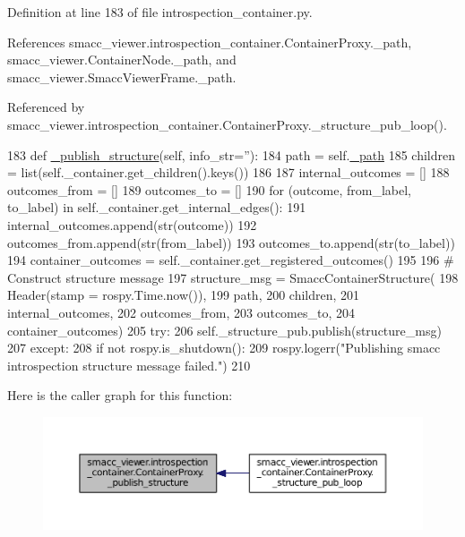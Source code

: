Definition at line 183 of file introspection\+\_\+container.\+py.



References smacc\+\_\+viewer.\+introspection\+\_\+container.\+Container\+Proxy.\+\_\+path, smacc\+\_\+viewer.\+Container\+Node.\+\_\+path, and smacc\+\_\+viewer.\+Smacc\+Viewer\+Frame.\+\_\+path.



Referenced by smacc\+\_\+viewer.\+introspection\+\_\+container.\+Container\+Proxy.\+\_\+structure\+\_\+pub\+\_\+loop().


\begin{DoxyCode}
183     \textcolor{keyword}{def }\hyperlink{classsmacc__viewer_1_1introspection__container_1_1ContainerProxy_a8d2ce0de04a41de61fea7a831b5d978d}{\_publish\_structure}(self, info\_str=''):
184         path = self.\hyperlink{classsmacc__viewer_1_1introspection__container_1_1ContainerProxy_a1196c9f62c5bf656de0dddba97f57884}{\_path}
185         children = list(self.\_container.get\_children().keys())
186 
187         internal\_outcomes = [] 
188         outcomes\_from = [] 
189         outcomes\_to = [] 
190         \textcolor{keywordflow}{for} (outcome, from\_label, to\_label) \textcolor{keywordflow}{in} self.\_container.get\_internal\_edges():
191             internal\_outcomes.append(str(outcome))
192             outcomes\_from.append(str(from\_label))
193             outcomes\_to.append(str(to\_label))
194         container\_outcomes = self.\_container.get\_registered\_outcomes()
195 
196         \textcolor{comment}{# Construct structure message}
197         structure\_msg = SmaccContainerStructure(
198                 Header(stamp = rospy.Time.now()),
199                 path,
200                 children,
201                 internal\_outcomes,
202                 outcomes\_from,
203                 outcomes\_to,
204                 container\_outcomes)
205         \textcolor{keywordflow}{try}:
206             self.\_structure\_pub.publish(structure\_msg)
207         \textcolor{keywordflow}{except}:
208             \textcolor{keywordflow}{if} \textcolor{keywordflow}{not} rospy.is\_shutdown():
209                 rospy.logerr(\textcolor{stringliteral}{"Publishing smacc introspection structure message failed."})
210 
\end{DoxyCode}


Here is the caller graph for this function\+:
\nopagebreak
\begin{figure}[H]
\begin{center}
\leavevmode
\includegraphics[width=350pt]{classsmacc__viewer_1_1introspection__container_1_1ContainerProxy_a8d2ce0de04a41de61fea7a831b5d978d_icgraph}
\end{center}
\end{figure}


